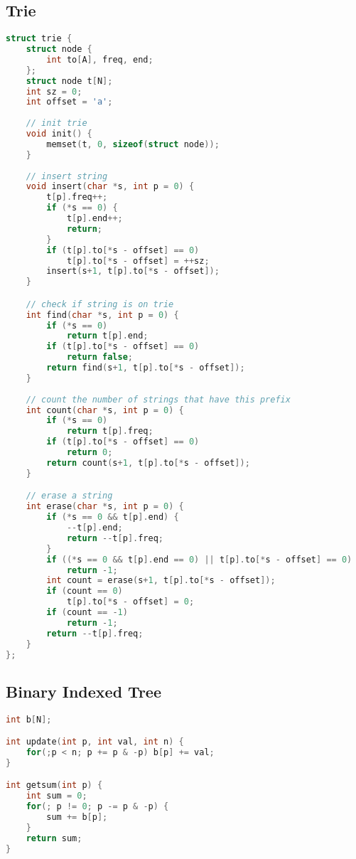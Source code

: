 \documentclass{article}
\begin{document}
\subsection{Trie}
\begin{lstlisting}[language=C++]
struct trie {
	struct node {
		int to[A], freq, end;
	};
	struct node t[N];
	int sz = 0;
	int offset = 'a';
	
	// init trie
	void init() {
		memset(t, 0, sizeof(struct node));
	}
	
	// insert string
	void insert(char *s, int p = 0) {
		t[p].freq++;
		if (*s == 0) {
			t[p].end++;
			return;
		}
		if (t[p].to[*s - offset] == 0)
			t[p].to[*s - offset] = ++sz;
		insert(s+1, t[p].to[*s - offset]);
	}

	// check if string is on trie
	int find(char *s, int p = 0) {
		if (*s == 0)
			return t[p].end;
		if (t[p].to[*s - offset] == 0)
			return false;
		return find(s+1, t[p].to[*s - offset]);
	}
	
	// count the number of strings that have this prefix
	int count(char *s, int p = 0) {
		if (*s == 0)
			return t[p].freq;
		if (t[p].to[*s - offset] == 0)
			return 0;
		return count(s+1, t[p].to[*s - offset]);
	}

	// erase a string
	int erase(char *s, int p = 0) {
		if (*s == 0 && t[p].end) {
			--t[p].end;
			return --t[p].freq;
		}
		if ((*s == 0 && t[p].end == 0) || t[p].to[*s - offset] == 0)
			return -1;
		int count = erase(s+1, t[p].to[*s - offset]);
		if (count == 0)
			t[p].to[*s - offset] = 0;
		if (count == -1)
			return -1;
		return --t[p].freq;
	}
};
\end{lstlisting}
\subsection{Binary Indexed Tree}
\begin{lstlisting}[language=C++]
int b[N];

int update(int p, int val, int n) {
	for(;p < n; p += p & -p) b[p] += val;
}

int getsum(int p) {
	int sum = 0;
	for(; p != 0; p -= p & -p) {
		sum += b[p];
	}
	return sum;
}
\end{lstlisting}
\end{document}
